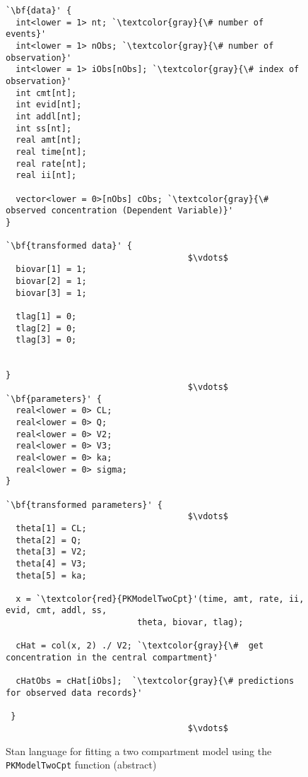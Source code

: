 \documentclass[11pt]{amsart}
\newenvironment{fmpage}[1]
     {\begin{lrbox}{\fmbox}\begin{minipage}{#1}}
     {\end{minipage}\end{lrbox}\fbox{\usebox{\fmbox}}}
\begin{document}
\begin{figure}[htbp]
\caption{Stan language for fitting a two compartment model using the \texttt{PKModelTwoCpt} function (abstract)}
\begin{center}
\begin{small}
\begin{fmpage}{\textwidth - .75in}
\begin{lstlisting}[basicstyle=\footnotesize\ttfamily,mathescape=true,flexiblecolumns=true,frame=single,escapeinside=`']
`\bf{data}' {
  int<lower = 1> nt; `\textcolor{gray}{\# number of events}'
  int<lower = 1> nObs; `\textcolor{gray}{\# number of observation}'
  int<lower = 1> iObs[nObs]; `\textcolor{gray}{\# index of observation}'
  int cmt[nt];
  int evid[nt];
  int addl[nt];
  int ss[nt];
  real amt[nt];
  real time[nt];
  real rate[nt];
  real ii[nt];
  
  vector<lower = 0>[nObs] cObs; `\textcolor{gray}{\#  observed concentration (Dependent Variable)}'
}

`\bf{transformed data}' {
                                    $\vdots$
  biovar[1] = 1;
  biovar[2] = 1;
  biovar[3] = 1;
  
  tlag[1] = 0;
  tlag[2] = 0;
  tlag[3] = 0;                                    
                                    
                                     
}
                                    $\vdots$ 
`\bf{parameters}' {
  real<lower = 0> CL;
  real<lower = 0> Q;
  real<lower = 0> V2;
  real<lower = 0> V3;
  real<lower = 0> ka;
  real<lower = 0> sigma;
}

`\bf{transformed parameters}' {
                                    $\vdots$ 
  theta[1] = CL;
  theta[2] = Q;
  theta[3] = V2;
  theta[4] = V3;
  theta[5] = ka;

  x = `\textcolor{red}{PKModelTwoCpt}'(time, amt, rate, ii, evid, cmt, addl, ss, 
                          theta, biovar, tlag);

  cHat = col(x, 2) ./ V2; `\textcolor{gray}{\#  get concentration in the central compartment}'
  
  cHatObs = cHat[iObs];  `\textcolor{gray}{\# predictions for observed data records}'
 
 }
                                    $\vdots$ 
\end{lstlisting}
\end{fmpage}
\end{small}
\end{center}
\label{TwoCptCode}
\end{figure}
\end{document}

